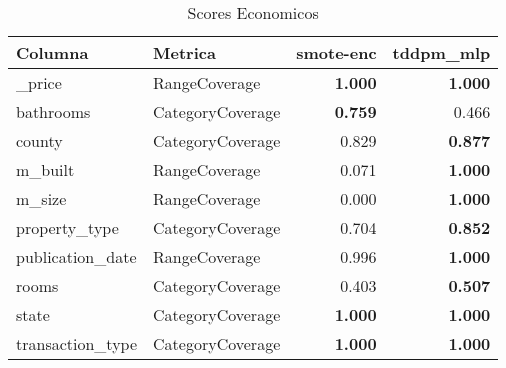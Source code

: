 \begin{table}[H]
\centering
\caption{Scores Economicos}
\label{table-coverage-economicos-b-1}
\begin{tabular}{|l|l|r|r|}
\hline
\rowcolor[gray]{0.8}
Columna & Metrica & smote-enc & tddpm\_mlp \\
\hline \_price & RangeCoverage & \bfseries 1.000 & \bfseries 1.000 \\
\hline bathrooms & CategoryCoverage & \bfseries 0.759 & 0.466 \\
\hline county & CategoryCoverage & 0.829 & \bfseries 0.877 \\
\hline m\_built & RangeCoverage & 0.071 & \bfseries 1.000 \\
\hline m\_size & RangeCoverage & 0.000 & \bfseries 1.000 \\
\hline property\_type & CategoryCoverage & 0.704 & \bfseries 0.852 \\
\hline publication\_date & RangeCoverage & 0.996 & \bfseries 1.000 \\
\hline rooms & CategoryCoverage & 0.403 & \bfseries 0.507 \\
\hline state & CategoryCoverage & \bfseries 1.000 & \bfseries 1.000 \\
\hline transaction\_type & CategoryCoverage & \bfseries 1.000 & \bfseries 1.000 \\
\hline
\end{tabular}
\end{table}
